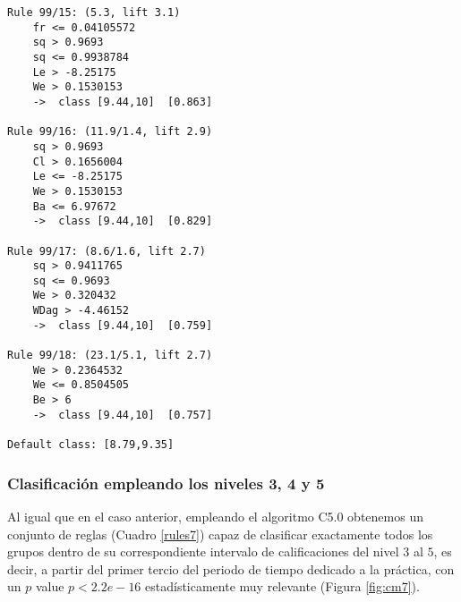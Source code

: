\begin{tcolorbox}[title=Reglas de clasificación para identificar intervalos de notas.]
\begin{multicols}{3}
\begin{verbatim}
Rule 99/15: (5.3, lift 3.1)
	fr <= 0.04105572
	sq > 0.9693
	sq <= 0.9938784
	Le > -8.25175
	We > 0.1530153
	->  class [9.44,10]  [0.863]

Rule 99/16: (11.9/1.4, lift 2.9)
	sq > 0.9693
	Cl > 0.1656004
	Le <= -8.25175
	We > 0.1530153
	Ba <= 6.97672
	->  class [9.44,10]  [0.829]

Rule 99/17: (8.6/1.6, lift 2.7)
	sq > 0.9411765
	sq <= 0.9693
	We > 0.320432
	WDag > -4.46152
	->  class [9.44,10]  [0.759]

Rule 99/18: (23.1/5.1, lift 2.7)
	We > 0.2364532
	We <= 0.8504505
	Be > 6
	->  class [9.44,10]  [0.757]
	
Default class: [8.79,9.35]
    \end{verbatim}
  \end{multicols}
\end{tcolorbox}

\subsubsection{Clasificación empleando los niveles 3, 4 y 5}

Al igual que en el caso anterior, empleando el algoritmo C5.0 obtenemos un conjunto de reglas (Cuadro \ref{rules7}) capaz de clasificar exactamente todos los grupos dentro de su correspondiente intervalo de calificaciones del nivel $3$ al $5$, es decir, a partir del primer tercio del periodo de tiempo dedicado a la práctica, con un $p$ value $p < 2.2e-16$ estadísticamente muy relevante (Figura \ref{fig:cm7}).

